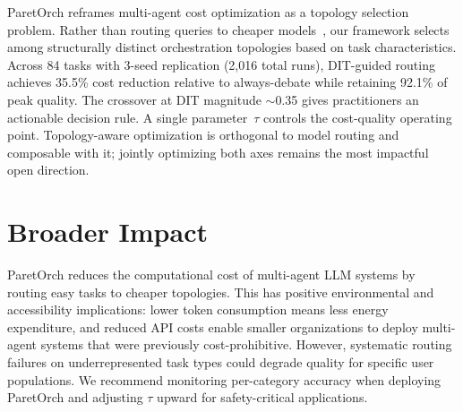 \documentclass{article}
\begin{document}
ParetOrch reframes multi-agent cost optimization as a topology selection problem. Rather than routing queries to cheaper models~\cite{chen2023frugalgpt, ong2024routellm}, our framework selects among structurally distinct orchestration topologies based on task characteristics. Across 84 tasks with 3-seed replication (2,016 total runs), DIT-guided routing achieves 35.5\% cost reduction relative to always-debate while retaining 92.1\% of peak quality. The crossover at DIT magnitude ${\sim}$0.35 gives practitioners an actionable decision rule. A single parameter~$\tau$ controls the cost-quality operating point. Topology-aware optimization is orthogonal to model routing and composable with it; jointly optimizing both axes remains the most impactful open direction.

\section*{Broader Impact}

ParetOrch reduces the computational cost of multi-agent LLM systems by routing easy tasks to cheaper topologies. This has positive environmental and accessibility implications: lower token consumption means less energy expenditure, and reduced API costs enable smaller organizations to deploy multi-agent systems that were previously cost-prohibitive. However, systematic routing failures on underrepresented task types could degrade quality for specific user populations. We recommend monitoring per-category accuracy when deploying ParetOrch and adjusting $\tau$ upward for safety-critical applications.
\end{document}
